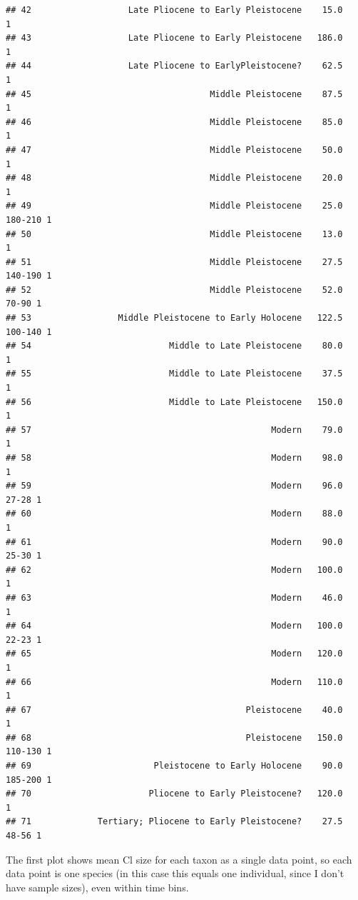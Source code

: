 \documentclass[]{article}
\begin{document}
\begin{verbatim}
## 42                   Late Pliocene to Early Pleistocene    15.0          1
## 43                   Late Pliocene to Early Pleistocene   186.0          1
## 44                   Late Pliocene to EarlyPleistocene?    62.5          1
## 45                                   Middle Pleistocene    87.5          1
## 46                                   Middle Pleistocene    85.0          1
## 47                                   Middle Pleistocene    50.0          1
## 48                                   Middle Pleistocene    20.0          1
## 49                                   Middle Pleistocene    25.0  180-210 1
## 50                                   Middle Pleistocene    13.0          1
## 51                                   Middle Pleistocene    27.5  140-190 1
## 52                                   Middle Pleistocene    52.0    70-90 1
## 53                 Middle Pleistocene to Early Holocene   122.5  100-140 1
## 54                           Middle to Late Pleistocene    80.0          1
## 55                           Middle to Late Pleistocene    37.5          1
## 56                           Middle to Late Pleistocene   150.0          1
## 57                                               Modern    79.0          1
## 58                                               Modern    98.0          1
## 59                                               Modern    96.0    27-28 1
## 60                                               Modern    88.0          1
## 61                                               Modern    90.0    25-30 1
## 62                                               Modern   100.0          1
## 63                                               Modern    46.0          1
## 64                                               Modern   100.0    22-23 1
## 65                                               Modern   120.0          1
## 66                                               Modern   110.0          1
## 67                                          Pleistocene    40.0          1
## 68                                          Pleistocene   150.0  110-130 1
## 69                        Pleistocene to Early Holocene    90.0  185-200 1
## 70                       Pliocene to Early Pleistocene?   120.0          1
## 71             Tertiary; Pliocene to Early Pleistocene?    27.5    48-56 1
\end{verbatim}

The first plot shows mean Cl size for each taxon as a single data point,
so each data point is one species (in this case this equals one
individual, since I don't have sample sizes), even within time bins.
\end{document}

